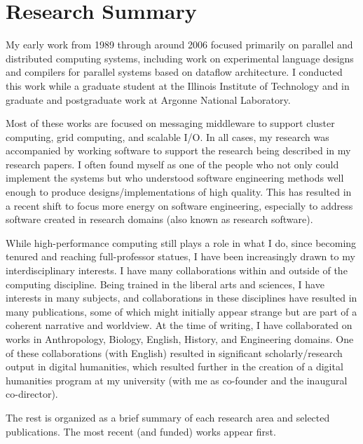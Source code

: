 \newpage

\section{Research Summary}

My early work from 1989 through around 2006 focused primarily on parallel and distributed computing systems, including work on experimental language designs and compilers for parallel systems based on dataflow architecture. I conducted this work while a graduate student at the Illinois Institute of Technology and in graduate and postgraduate work at Argonne National Laboratory.
\vspace{5pt}

Most of these works are focused on messaging middleware to support cluster computing, grid computing, and scalable I/O. In all cases, my research was accompanied by working software to support the research being described in my research papers. I often found myself as one of the people who not only could implement the systems but who understood software engineering methods well enough to produce designs/implementations of high quality. This has resulted in a recent shift to focus more energy on software engineering, especially to address software created in research domains (also known as research software).
\vspace{5pt}

While high-performance computing still plays a role in what I do, since becoming tenured and reaching full-professor statues, I have been increasingly drawn to my interdisciplinary interests. I have many collaborations within and outside of the computing discipline. Being trained in the liberal arts and sciences, I have interests in many subjects, and collaborations in these disciplines have resulted in many publications, some of which might initially appear strange but are part of a coherent narrative and worldview. At the time of writing, I have collaborated on works in Anthropology, Biology, English, History, and Engineering domains. One of these collaborations (with English) resulted in significant scholarly/research output in digital humanities, which resulted further in the creation of a digital humanities program at my university (with me as co-founder and the inaugural co-director).
\vspace{5pt}

The rest is organized as a brief summary of each research area and selected publications. The most recent (and funded) works appear first.














